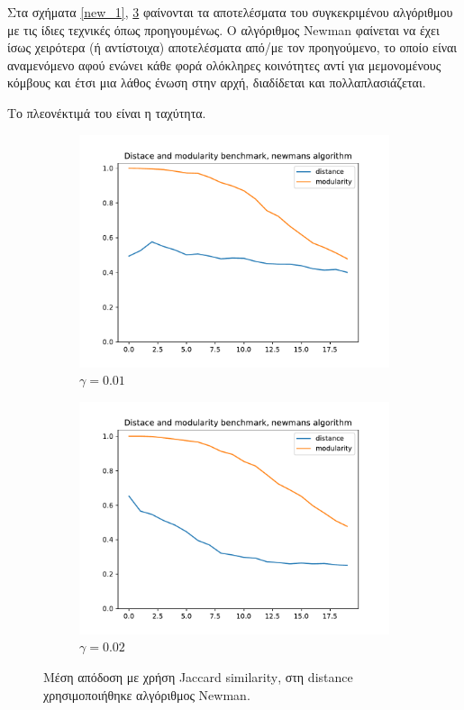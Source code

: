 \documentclass[12pt, letterpaper]{article}
\begin{document}
Στα σχήματα \ref{new_1}, \ref{new_2} φαίνονται τα αποτελέσματα του συγκεκριμένου αλγόριθμου 
με τις ίδιες τεχνικές όπως προηγουμένως. 
Ο αλγόριθμος \textlatin{Newman} φαίνεται να έχει ίσως χειρότερα (ή αντίστοιχα) αποτελέσματα από/με τον 
προηγούμενο, το οποίο είναι αναμενόμενο αφού ενώνει κάθε φορά ολόκληρες κοινότητες 
αντί για μεμονομένους κόμβους και έτσι μια λάθος ένωση στην αρχή, διαδίδεται και πολλαπλασιάζεται.

Το πλεονέκτιμά του είναι η ταχύτητα. 


\begin{figure}
  \begin{subfigure}{0.5\textwidth}
    \centering
    \includegraphics[width=0.8\linewidth]{benchmark_newman_gamma=0.01.pdf}
    \caption{$\gamma = 0.01$}
    \label{fig:bench0.01new}
  \end{subfigure}
  \begin{subfigure}{0.5\textwidth}
    \centering
    \includegraphics[width=0.8\linewidth]{benchmark_newman_gamma=0.02.pdf}
    \caption{$\gamma = 0.02$}
    \label{fig:bench0.02new}
  \end{subfigure}
  \caption{Μέση απόδοση με χρήση \textlatin{Jaccard similarity}, στη \textlatin{distance}
  χρησιμοποιήθηκε αλγόριθμος \textlatin{Newman}.}
  \label{new_2}
\end{figure}
\end{document}
